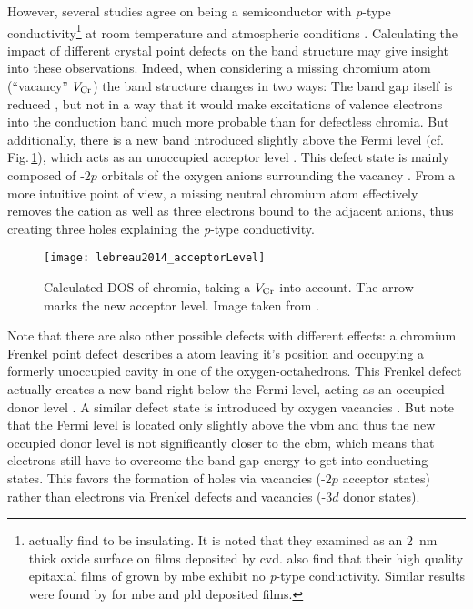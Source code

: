 However, several studies agree on  being a semiconductor with \textit{p}-type conductivity\footnote{
    \textcite{cheng2001a} actually find  to be insulating. It is noted that they examined  as an \qty{2}{\nm} thick oxide surface on  films deposited by \gls{cvd}.
    \textcite{farrell2015} also find that their high quality epitaxial films of  grown by \gls{mbe} exhibit no \textit{p}-type conductivity.
    Similar results were found by \textcite{kehoe2016} for \gls{mbe} and \gls{pld} deposited films.
}
at room temperature and atmospheric conditions
    \cite{kofstad1980,cheng1996,caricato2010,lebreau2014,mi2018,singh2019,polyakov2022a}.
Calculating the impact of different crystal point defects on the band structure may give insight into these observations.
Indeed, when considering a missing chromium atom (\enquote{vacancy} $V_{\ce{Cr}}$) the band structure changes in two ways:
The band gap itself is reduced \cite{mi2018}, but not in a way that it would make excitations of valence electrons into the conduction band much more probable than for defectless chromia.
But additionally, there is a new band introduced slightly above the Fermi level (cf. Fig.\,\ref{Fig:lebreau2014_acceptorLevel}), which acts as an unoccupied acceptor level
    \cite{mi2018}.
This defect state is mainly composed of -$2p$ orbitals of the oxygen anions surrounding the vacancy
    \cite{lebreau2014}.
From a more intuitive point of view, a missing neutral chromium atom effectively removes the  cation as well as three electrons bound to the adjacent  anions, thus creating three holes \cite{lebreau2014} explaining the \textit{p}-type conductivity.
\begin{figure}
    \centering
    \texttt{[image: lebreau2014\_acceptorLevel]}
    \caption{Calculated \acrfull{DOS} of chromia, taking a $V_{\ce{Cr}}$ into account.
    The arrow marks the new acceptor level.
    Image taken from \cite{lebreau2014}.}
    \label{Fig:lebreau2014_acceptorLevel}
\end{figure}

Note that there are also other possible defects with different effects:
a chromium Frenkel point defect describes a  atom leaving it's position and occupying a formerly unoccupied cavity in one of the oxygen-octahedrons.
This Frenkel defect actually creates a new band right below the Fermi level, acting as an occupied donor level
    \cite{lebreau2014}.
A similar defect state is introduced by oxygen vacancies
    \cite{mi2018}.
But note that the Fermi level is located only slightly above the \gls{vbm} and thus the new occupied donor level is not significantly closer to the \gls{cbm}, which means that electrons still have to overcome the band gap energy to get into conducting states.
This favors the formation of holes via  vacancies (-$2p$ acceptor states) rather than electrons via  Frenkel defects and  vacancies (-$3d$ donor states).

